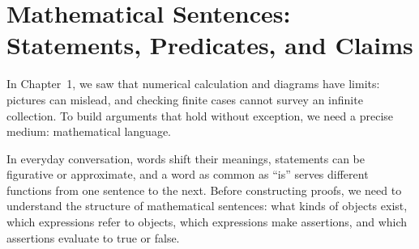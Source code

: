 \section{Mathematical Sentences: Statements, Predicates, and Claims}
\chapterline

In Chapter~1, we saw that numerical calculation and diagrams have limits: pictures can mislead, and checking finite cases cannot survey an infinite collection. To build arguments that hold without exception, we need a precise medium: mathematical language.

In everyday conversation, words shift their meanings, statements can be figurative or approximate, and a word as common as ``is'' serves different functions from one sentence to the next. Before constructing proofs, we need to understand the structure of mathematical sentences: what kinds of objects exist, which expressions refer to objects, which expressions make assertions, and which assertions evaluate to true or false.


